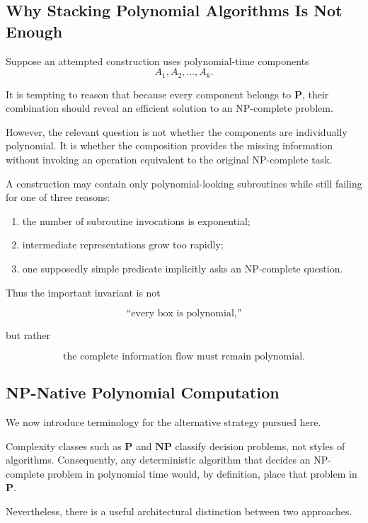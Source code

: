 \documentclass[11pt]{article}
\theoremstyle{plain}
\theoremstyle{definition}
\begin{document}
\subsection{Why Stacking Polynomial Algorithms Is Not Enough}

Suppose an attempted construction uses polynomial-time components
\[
    A_1,A_2,\dots,A_k.
\]

It is tempting to reason that because every component belongs to
\(\mathbf{P}\), their combination should reveal an efficient solution to an
NP-complete problem.

However, the relevant question is not whether the components are individually
polynomial.  It is whether the composition provides the missing information
without invoking an operation equivalent to the original NP-complete task.

A construction may contain only polynomial-looking subroutines while still
failing for one of three reasons:

\begin{enumerate}
    \item the number of subroutine invocations is exponential;
    \item intermediate representations grow too rapidly;
    \item one supposedly simple predicate implicitly asks an NP-complete
    question.
\end{enumerate}

Thus the important invariant is not

\[
    \text{``every box is polynomial,''}
\]

but rather

\[
    \boxed{
    \text{the complete information flow must remain polynomial.}
    }
\]

\subsection{NP-Native Polynomial Computation}

We now introduce terminology for the alternative strategy pursued here.

Complexity classes such as \(\mathbf{P}\) and \(\mathbf{NP}\) classify
decision problems, not styles of algorithms.  Consequently, any
deterministic algorithm that decides an NP-complete problem in polynomial time
would, by definition, place that problem in \(\mathbf{P}\).

Nevertheless, there is a useful architectural distinction between two
approaches.
\end{document}
